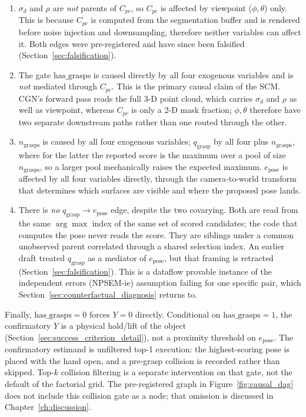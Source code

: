 \documentclass[11pt,a4paper]{report}
\begin{document}
\begin{enumerate}
  \item $\sigma_d$ and $\rho$ are \emph{not} parents of $C_{pc}$, so $C_{pc}$ is affected by viewpoint ($\phi,\theta$) only. This is because $C_{pc}$ is computed from the segmentation buffer and is rendered before noise injection and downsampling, therefore neither variables can affect it. Both edges were pre-registered and have since been falsified (Section~\ref{sec:falsification}).

  \item The gate $\text{has\_grasps}$ is caused directly by all four exogenous variables and is \emph{not} mediated through $C_{pc}$. This is the primary causal claim of the SCM. CGN's forward pass reads the full 3-D point cloud, which carries $\sigma_d$ and $\rho$ as well as viewpoint, whereas $C_{pc}$ is only a 2-D mask fraction; $\phi,\theta$ therefore have two separate downstream paths rather than one routed through the other.

  \item $n_{\text{grasps}}$ is caused by all four exogenous variables; $q_{\text{grasp}}$ by all four plus $n_{\text{grasps}}$, where for the latter the reported score is the maximum over a pool of size $n_{\text{grasps}}$, so a larger pool mechanically raises the expected maximum. $e_{\text{pose}}$ is affected by all four variables directly, through the camera-to-world transform that determines which surfaces are visible and where the proposed pose lands.

  \item There is \emph{no} $q_{\text{grasp}} \to e_{\text{pose}}$ edge, despite the two covarying. Both are read from the same $\arg\max$ index of the same set of scored candidates; the code that computes the pose never reads the score. They are siblings under a common unobserved parent correlated through a shared selection index. An earlier draft treated $q_{\text{grasp}}$ as a mediator of $e_{\text{pose}}$, but that framing is retracted (Section~\ref{sec:falsification}). This is a dataflow provable instance of the independent errors (NPSEM-ie) assumption failing for one specific pair, which Section~\ref{sec:counterfactual_diagnosis} returns to.
\end{enumerate}

\noindent Finally, $\text{has\_grasps}=0$ forces $Y=0$ directly. Conditional on $\text{has\_grasps}=1$, the confirmatory $Y$ is a physical hold/lift of the object (Section~\ref{sec:success_criterion_detail}), not a proximity threshold on $e_{\text{pose}}$. The confirmatory estimand is unfiltered top-1 execution: the highest-scoring pose is placed with the hand open, and a pre-grasp collision is recorded rather than skipped. Top-$k$ collision filtering is a separate intervention on that gate, not the default of the factorial grid. The pre-registered graph in Figure~\ref{fig:causal_dag} does not include this collision gate as a node; that omission is discussed in Chapter~\ref{ch:discussion}.
\end{document}
